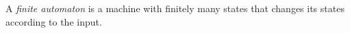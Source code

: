 

\setcounter{section}{1}
\setcounter{subsection}{2}
\setcounter{dfn}{0}

A \emph{finite automaton} is a machine with finitely many states that changes its states according to the input.



